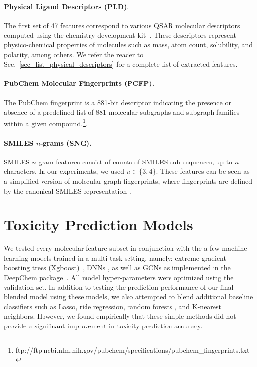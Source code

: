 \documentclass[11pt,a4paper]{article}
\begin{document}
\paragraph{Physical Ligand Descriptors (PLD).}The first set of 47 features correspond to various QSAR molecular descriptors computed using
the chemistry development kit~\cite{Steinbeck:2003aa}. These descriptors represent
physico-chemical properties of molecules such as mass, atom count, solubility,
and polarity, among others. We refer the reader to Sec.~\ref{sec_list_physical_descriptors} 
for a complete list of extracted features. 

\paragraph{PubChem Molecular Fingerprints (PCFP).}The PubChem fingerprint is a 881-bit descriptor indicating the presence or absence 
of a predefined list of 881 molecular subgraphs and subgraph families within a given
compound.\footnote{ftp://ftp.ncbi.nlm.nih.gov/pubchem/specifications/pubchem\_fingerprints.txt}. 

\paragraph{SMILES $n$-grams (SNG).}SMILES $n$-gram features consist of counts of SMILES sub-sequences, up to $n$ characters.
In our experiments, we used $n \in \{3, 4\}$. These features can be seen as a simplified version of
molecular-graph fingerprints, where fingerprints are defined by the canonical SMILES
representation~\cite{Steinbeck:2003aa}.

\section{Toxicity Prediction Models}
\label{sec:models}
We tested every molecular feature subset in conjunction with the a few machine
learning models trained in a multi-task setting, namely:
extreme gradient boosting trees (Xgboost)~\cite{Chen2016},
DNNs \cite{CBH2015}, as well as GCNs as implemented in the 
DeepChem package~\cite{Wu:2017}. All model hyper-parameters were optimized using
the validation set. In addition to testing the prediction performance of our
final blended model using these models, we also attempted to blend additional
baseline classifiers such as Lasso, ride regression, random forests \cite{Ho1995},
and K-nearest neighbors. However, we found empirically that these simple 
methods did not provide a significant improvement in toxicity prediction 
accuracy.
\end{document}
